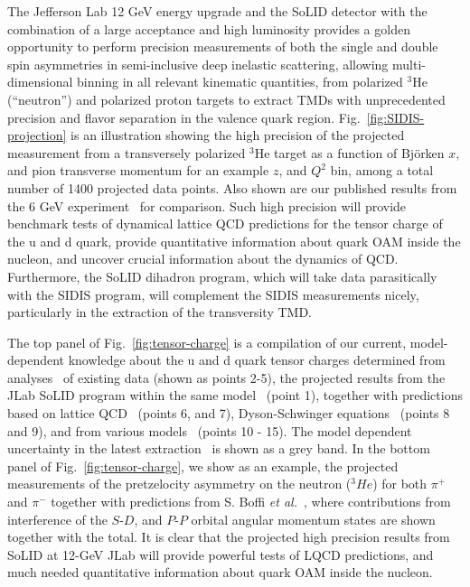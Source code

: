 \documentclass[12pt]{article}
\begin{document}
The Jefferson Lab 12 GeV energy upgrade and the SoLID detector with the combination of a large acceptance and high luminosity 
provides a golden opportunity to perform precision measurements of both the single and double spin asymmetries in semi-inclusive deep inelastic scattering, allowing multi-dimensional binning in all relevant kinematic quantities,   
 from polarized $^3$He (``neutron'') and polarized proton targets to 
extract TMDs with unprecedented precision and flavor separation in the valence quark region. Fig.~\ref{fig:SIDIS-projection} is an illustration showing the 
high precision of the projected measurement from a transversely polarized $^3$He target as a function of Bj\"{o}rken $x$, and pion transverse momentum for an example $z$, and $Q^2$ bin, among a total number of 1400 projected data points. Also shown are our published results from the 6 GeV experiment~\cite{xqian} for comparison.     
Such high precision will provide benchmark tests of dynamical lattice QCD predictions for the tensor charge of the u and d quark, provide quantitative information about quark OAM inside the nucleon, and uncover crucial information 
about the dynamics of QCD.  Furthermore, the SoLID dihadron program, which will take data parasitically with the SIDIS program, will complement the SIDIS measurements nicely, particularly in the extraction of the transversity TMD. 

The top panel of Fig.~\ref{fig:tensor-charge} is a compilation of our current, model-dependent 
knowledge about the u and d quark tensor charges determined from analyses~\cite{Anselmino2013,Anselmino2009,Bacchetta2013} of existing data (shown as points 2-5), the projected results from the JLab SoLID program within the same model~\cite{Prokudin2014} (point 1), together with predictions based on lattice QCD~\cite{Alexandrou2014, Gockeler2005} (points 6, and 7), Dyson-Schwinger equations~\cite{Pitschmann2014, Hecht2001} (points 8 and 9), and from various models~\cite{Cloet2008,Pasquini2007,Wakamatsu2007,Gamberg2001,He1995} (points 10 - 15).
The model dependent uncertainty in the latest extraction~\cite{Anselmino2013} is shown as a grey band. 
In the bottom panel of Fig.~\ref{fig:tensor-charge}, we show as an example, the projected measurements of the pretzelocity asymmetry on the neutron ($^3He$) for both $\pi^+$ and $\pi^-$ together with predictions from S. Boffi {\it et al.}~\cite{pasquini2009}, where contributions from interference of the $S$-$D$, and $P$-$P$ orbital angular momentum states are shown together with the total.   
It is clear that the projected high precision results from SoLID at 12-GeV JLab will provide powerful tests of LQCD predictions, and much needed quantitative information about quark OAM inside the nucleon.  
\end{document}
